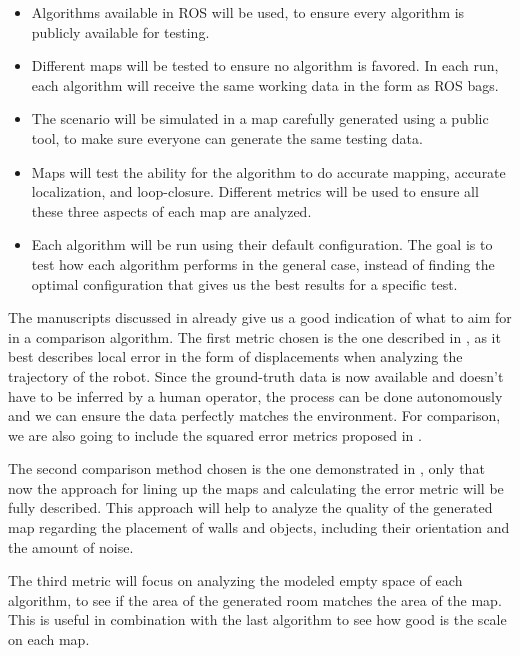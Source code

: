  \begin{itemize}
     \item Algorithms available in ROS will be used, to ensure every algorithm is publicly available for testing.
     \item Different maps will be tested to ensure no algorithm is favored. In each run, each algorithm will receive the same working data in the form as ROS bags.
     \item The scenario will be simulated in a map carefully generated using a public tool, to make sure everyone can generate the same testing data.
     \item Maps will test the ability for the algorithm to do accurate mapping, accurate localization, and loop-closure. Different metrics will be used to ensure all these three aspects of each map are analyzed.
     \item Each algorithm will be run using their default configuration. The goal is to test how each algorithm performs in the general case, instead of finding the optimal configuration that gives us the best results for a specific test.
 \end{itemize}
 
The manuscripts discussed in  already give us a good indication of what to aim for in a comparison algorithm. The first metric chosen is the one described in \cite{kummerle2009measuring}, as it best describes local error in the form of displacements when analyzing the trajectory of the robot. Since the ground-truth data is now available and doesn't have to be inferred by a human operator, the process can be done autonomously and we can ensure the data perfectly matches the environment. For comparison, we are also going to include the squared error metrics proposed in .

The second comparison method chosen is the one demonstrated in \cite{santos2013evaluation}, only that now the approach for lining up the maps and calculating the error metric will be fully described. This approach will help to analyze the quality of the generated map regarding the placement of walls and objects, including their orientation and the amount of noise.

The third metric will focus on analyzing the modeled empty space of each algorithm, to see if the area of the generated room matches the area of the map. This is useful in combination with the last algorithm to see how good is the scale on each map.

